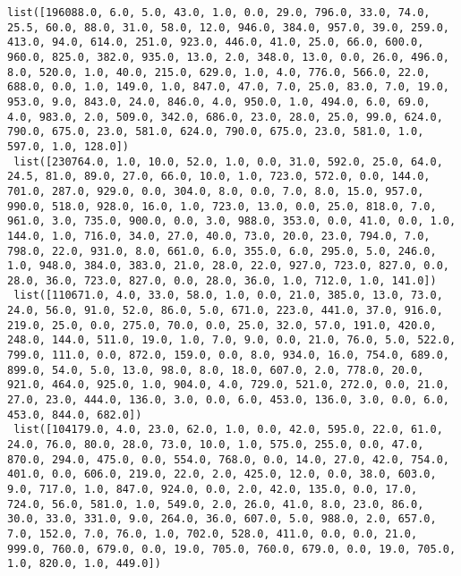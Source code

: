 \documentclass[11pt]{article}
\begin{document}
\begin{Verbatim}[commandchars=\\\{\}]
 list([196088.0, 6.0, 5.0, 43.0, 1.0, 0.0, 29.0, 796.0, 33.0, 74.0, 25.5, 60.0, 88.0, 31.0, 58.0, 12.0, 946.0, 384.0, 957.0, 39.0, 259.0, 413.0, 94.0, 614.0, 251.0, 923.0, 446.0, 41.0, 25.0, 66.0, 600.0, 960.0, 825.0, 382.0, 935.0, 13.0, 2.0, 348.0, 13.0, 0.0, 26.0, 496.0, 8.0, 520.0, 1.0, 40.0, 215.0, 629.0, 1.0, 4.0, 776.0, 566.0, 22.0, 688.0, 0.0, 1.0, 149.0, 1.0, 847.0, 47.0, 7.0, 25.0, 83.0, 7.0, 19.0, 953.0, 9.0, 843.0, 24.0, 846.0, 4.0, 950.0, 1.0, 494.0, 6.0, 69.0, 4.0, 983.0, 2.0, 509.0, 342.0, 686.0, 23.0, 28.0, 25.0, 99.0, 624.0, 790.0, 675.0, 23.0, 581.0, 624.0, 790.0, 675.0, 23.0, 581.0, 1.0, 597.0, 1.0, 128.0])
 list([230764.0, 1.0, 10.0, 52.0, 1.0, 0.0, 31.0, 592.0, 25.0, 64.0, 24.5, 81.0, 89.0, 27.0, 66.0, 10.0, 1.0, 723.0, 572.0, 0.0, 144.0, 701.0, 287.0, 929.0, 0.0, 304.0, 8.0, 0.0, 7.0, 8.0, 15.0, 957.0, 990.0, 518.0, 928.0, 16.0, 1.0, 723.0, 13.0, 0.0, 25.0, 818.0, 7.0, 961.0, 3.0, 735.0, 900.0, 0.0, 3.0, 988.0, 353.0, 0.0, 41.0, 0.0, 1.0, 144.0, 1.0, 716.0, 34.0, 27.0, 40.0, 73.0, 20.0, 23.0, 794.0, 7.0, 798.0, 22.0, 931.0, 8.0, 661.0, 6.0, 355.0, 6.0, 295.0, 5.0, 246.0, 1.0, 948.0, 384.0, 383.0, 21.0, 28.0, 22.0, 927.0, 723.0, 827.0, 0.0, 28.0, 36.0, 723.0, 827.0, 0.0, 28.0, 36.0, 1.0, 712.0, 1.0, 141.0])
 list([110671.0, 4.0, 33.0, 58.0, 1.0, 0.0, 21.0, 385.0, 13.0, 73.0, 24.0, 56.0, 91.0, 52.0, 86.0, 5.0, 671.0, 223.0, 441.0, 37.0, 916.0, 219.0, 25.0, 0.0, 275.0, 70.0, 0.0, 25.0, 32.0, 57.0, 191.0, 420.0, 248.0, 144.0, 511.0, 19.0, 1.0, 7.0, 9.0, 0.0, 21.0, 76.0, 5.0, 522.0, 799.0, 111.0, 0.0, 872.0, 159.0, 0.0, 8.0, 934.0, 16.0, 754.0, 689.0, 899.0, 54.0, 5.0, 13.0, 98.0, 8.0, 18.0, 607.0, 2.0, 778.0, 20.0, 921.0, 464.0, 925.0, 1.0, 904.0, 4.0, 729.0, 521.0, 272.0, 0.0, 21.0, 27.0, 23.0, 444.0, 136.0, 3.0, 0.0, 6.0, 453.0, 136.0, 3.0, 0.0, 6.0, 453.0, 844.0, 682.0])
 list([104179.0, 4.0, 23.0, 62.0, 1.0, 0.0, 42.0, 595.0, 22.0, 61.0, 24.0, 76.0, 80.0, 28.0, 73.0, 10.0, 1.0, 575.0, 255.0, 0.0, 47.0, 870.0, 294.0, 475.0, 0.0, 554.0, 768.0, 0.0, 14.0, 27.0, 42.0, 754.0, 401.0, 0.0, 606.0, 219.0, 22.0, 2.0, 425.0, 12.0, 0.0, 38.0, 603.0, 9.0, 717.0, 1.0, 847.0, 924.0, 0.0, 2.0, 42.0, 135.0, 0.0, 17.0, 724.0, 56.0, 581.0, 1.0, 549.0, 2.0, 26.0, 41.0, 8.0, 23.0, 86.0, 30.0, 33.0, 331.0, 9.0, 264.0, 36.0, 607.0, 5.0, 988.0, 2.0, 657.0, 7.0, 152.0, 7.0, 76.0, 1.0, 702.0, 528.0, 411.0, 0.0, 0.0, 21.0, 999.0, 760.0, 679.0, 0.0, 19.0, 705.0, 760.0, 679.0, 0.0, 19.0, 705.0, 1.0, 820.0, 1.0, 449.0])

\end{Verbatim}
\end{document}
